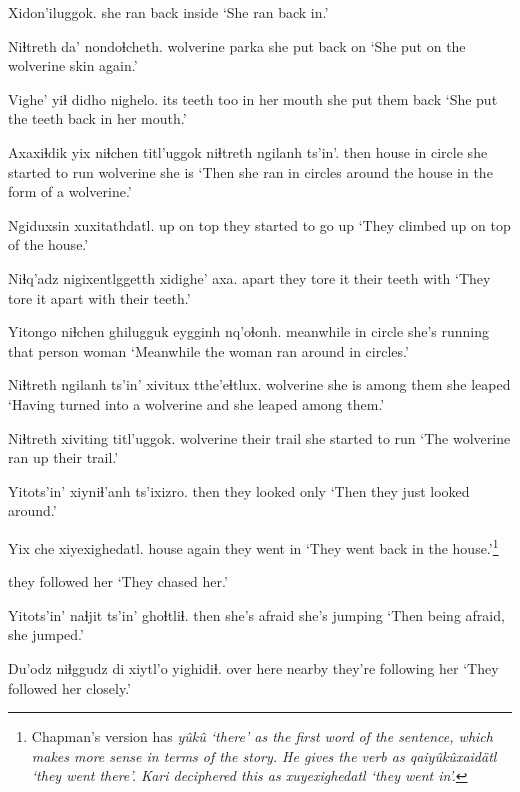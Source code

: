 \documentclass[12pt]{article}
\begin{document}
\gll Xidon'iluggok.
{{she ran back inside}}
\glt `She ran back in.'
\glend

\gll Niɬtreth da' nondoɬcheth.
wolverine parka {she put back on}
\glt `She put on the wolverine skin again.'
\glend

\gll Vighe' yiɬ didho  nighelo.
{its teeth} too {in her mouth} {she put them back}
\glt `She put the teeth back in her mouth.'
\glend

\gll Axaxiɬdik yix niɬchen titl'uggok  niɬtreth ngilanh ts'in'.
then  house {in circle} {she started to run} wolverine {she is} {}
\glt `Then she ran in circles around the house in the form of a wolverine.'
\glend

\gll Ngiduxsin xuxitathdatl.
{up on top} {they started to go up}
\glt `They climbed up on top  of the house.'
\glend

\gll Niɬq'adz nigixentlggetth xidighe' axa.
apart  {they tore it} {their teeth} with
\glt `They tore it apart with their teeth.'
\glend

\gll Yitongo niɬchen ghilugguk  eygginh nq'oɬonh.
meanwhile {in circle} {she's running} {that person}  woman
\glt `Meanwhile the woman ran around in circles.'
\glend

\gll Niɬtreth ngilanh ts'in' xivitux tthe'eɬtlux.
wolverine {she is} {} {among them} {she leaped}
\glt `Having turned into a wolverine and she leaped among them.'
\glend

\gll Niɬtreth xiviting titl'uggok.
wolverine {their trail} {she started to run}
\glt `The wolverine ran up their trail.'
\glend

\gll Yitots'in' xiyniɬ'anh ts'ixizro.
then  {they looked} only
\glt `Then they just looked around.'
\glend

\gll Yix che xiyexighedatl.
house again {they went in}
\glt `They went back in the house.'\footnote{Chapman's version has \em y\^uk\^u \em `there' as the first word of the sentence, which makes more sense in terms of the story. He gives the verb as \em qaiy\^uk\^uxaid\"atl \em `they went there'. Kari deciphered this as \em xuyexighedatl \em `they went in'.}
\glend

{{they followed her}} 
\glt `They chased her.'
\glend

\gll Yitots'in' naɬjit ts'in' ghoɬtliɬ.
then {she's afraid} {} {she's jumping}
\glt `Then being afraid, she jumped.'
\glend

\gll Du'odz {niɬggudz di} {xiytl'o yighidiɬ.}
{over here} nearby  {they're following her}
\glt `They followed her closely.'
\glend
\end{document}
